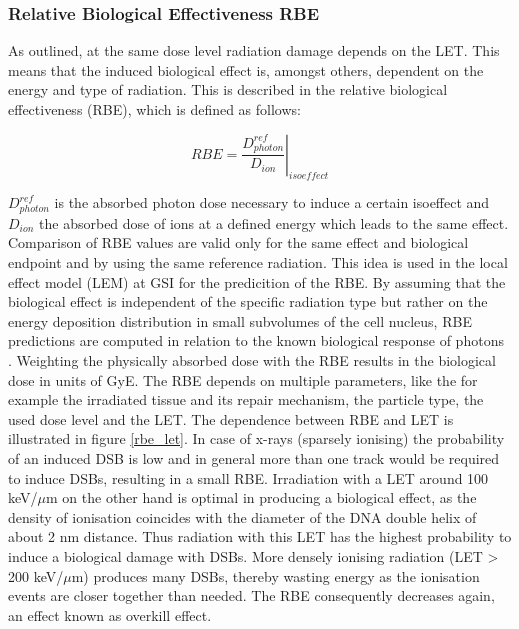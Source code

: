 \documentclass[type=dr, dr=rernat, accentcolor=tud7b,colorbacktitle, bigchapter, openright, twoside, 12pt ]{tudthesis}
\begin{document}
\subsubsection{Relative Biological Effectiveness RBE}

As outlined, at the same dose level radiation damage depends on the LET.  This means that the induced biological effect 
is, amongst others, dependent on the energy and type of radiation. This is described in the relative biological effectiveness (RBE), 
which is defined as follows:

\begin{equation}
 RBE = \left.\frac{D^{ref}_{photon}}{D_{ion}} \right|_{isoeffect}
\end{equation}

$D^{ref}_{photon}$ is the absorbed photon dose necessary to induce a certain isoeffect and $D_{ion}$ the absorbed dose of ions at a 
defined energy which leads to the same effect. Comparison of RBE values are valid only for the same effect and biological endpoint 
and by using the same reference radiation. This idea is used in the local effect model (LEM) at GSI for the predicition of the RBE. By 
assuming that the biological effect is independent of the specific radiation type but rather on the energy deposition distribution 
in small subvolumes of the cell nucleus, RBE predictions are computed in relation to the known biological response of photons 
\cite{Krae03} \cite{Frie13}. Weighting the physically absorbed dose with the RBE results in the biological dose in units of GyE. \newline
\newline
The RBE depends on multiple parameters, like the for example the irradiated tissue and its repair mechanism, the particle type, the used 
dose level and the LET. The dependence between RBE and LET is illustrated in figure \ref{rbe_let}. In case of x-rays (sparsely ionising) 
the probability of an induced DSB is low and in general more than one track would be required to induce DSBs, resulting in a small RBE. 
Irradiation with a LET around 100 keV/${\mu}$m on the other hand is optimal in producing a biological effect, as the 
density of ionisation coincides with the diameter of the DNA double helix of about 2 nm distance. Thus radiation with this LET has the 
highest probability to induce a biological damage with DSBs. More densely ionising radiation (LET > 200 keV/${\mu}$m) produces many DSBs, 
thereby wasting energy as the ionisation events are closer together than needed. The RBE consequently decreases again, an 
effect known as overkill effect. 
\end{document}
